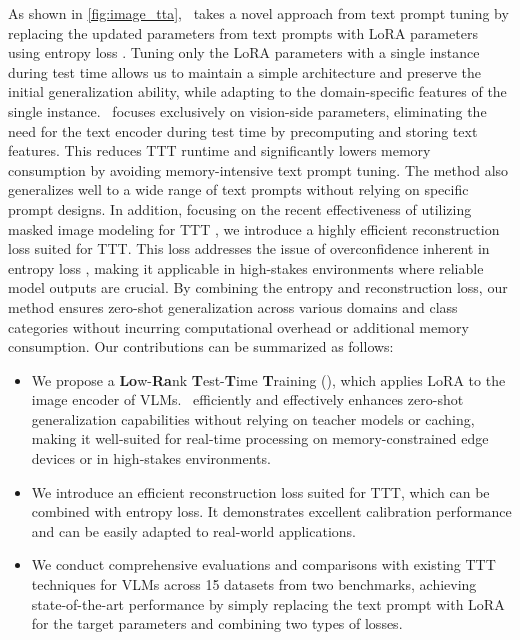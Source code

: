 As shown in \cref{fig:image_tta}, \name\ takes a novel approach from text prompt tuning by replacing the updated parameters from text prompts with LoRA parameters using entropy loss \citep{zhang2022memo,shu2022test}.
Tuning only the LoRA parameters with a single instance during test time allows us to maintain a simple architecture and preserve the initial generalization ability, while adapting to the domain-specific features of the single instance.
\name\ focuses exclusively on vision-side parameters, eliminating the need for the text encoder during test time by precomputing and storing text features.
This reduces TTT runtime and significantly lowers memory consumption by avoiding memory-intensive text prompt tuning.
The method also generalizes well to a wide range of text prompts without relying on specific prompt designs.
In addition, focusing on the recent effectiveness of utilizing masked image modeling for TTT \citep{gandelsman2022test,wang2023test,liu2024continual}, we introduce a highly efficient reconstruction loss suited for TTT.
This loss addresses the issue of overconfidence inherent in entropy loss \citep{guo2017calibration,yoon2024c}, making it applicable in high-stakes environments \citep{wang2022medclip,liu2023clip,dorbala2022clip,khandelwal2022simple} where reliable model outputs are crucial.
By combining the entropy and reconstruction loss, our method ensures zero-shot generalization across various domains and class categories without incurring computational overhead or additional memory consumption. Our contributions can be summarized as follows:
\newline
\begin{itemize}
    \item We propose a \textbf{Lo}w-\textbf{Ra}nk \textbf{T}est-\textbf{T}ime \textbf{T}raining (\name), which applies LoRA to the image encoder of VLMs. \name\ efficiently and effectively enhances zero-shot generalization capabilities without relying on teacher models or caching, making it well-suited for real-time processing on memory-constrained edge devices or in high-stakes environments.
    \item We introduce an efficient reconstruction loss suited for TTT, which can be combined with entropy loss. It demonstrates excellent calibration performance and can be easily adapted to real-world applications.
    \item We conduct comprehensive evaluations and comparisons with existing TTT techniques for VLMs across 15 datasets from two benchmarks, achieving state-of-the-art performance by simply replacing the text prompt with LoRA for the target parameters and combining two types of losses.
\end{itemize}